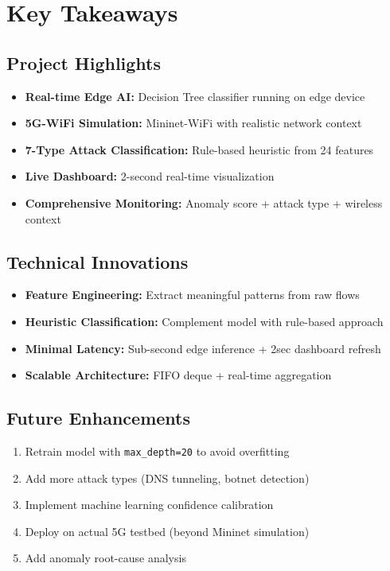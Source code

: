 \documentclass[12pt,a4paper]{article}
\begin{document}
\section{Key Takeaways}

\subsection{Project Highlights}

\begin{itemize}
    \item \textbf{Real-time Edge AI:} Decision Tree classifier running on edge device
    \item \textbf{5G-WiFi Simulation:} Mininet-WiFi with realistic network context
    \item \textbf{7-Type Attack Classification:} Rule-based heuristic from 24 features
    \item \textbf{Live Dashboard:} 2-second real-time visualization
    \item \textbf{Comprehensive Monitoring:} Anomaly score + attack type + wireless context
\end{itemize}

\subsection{Technical Innovations}

\begin{itemize}
    \item \textbf{Feature Engineering:} Extract meaningful patterns from raw flows
    \item \textbf{Heuristic Classification:} Complement model with rule-based approach
    \item \textbf{Minimal Latency:} Sub-second edge inference + 2sec dashboard refresh
    \item \textbf{Scalable Architecture:} FIFO deque + real-time aggregation
\end{itemize}

\subsection{Future Enhancements}

\begin{enumerate}
    \item Retrain model with \texttt{max\_depth=20} to avoid overfitting
    \item Add more attack types (DNS tunneling, botnet detection)
    \item Implement machine learning confidence calibration
    \item Deploy on actual 5G testbed (beyond Mininet simulation)
    \item Add anomaly root-cause analysis
\end{enumerate}

\end{document}
